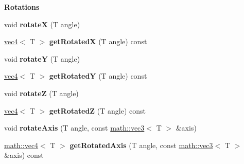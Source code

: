 \begin{Indent}{\bf Rotations}\par
{\em \label{_amgrpe3a9f3ceea2a861d915023ad0a1b98b0}
 }\begin{DoxyCompactItemize}
\item 
\hypertarget{classmath_1_1vec4_a0c0b102f730831e00f43a23a1561bbf1}{
void {\bfseries rotateX} (T angle)}
\label{classmath_1_1vec4_a0c0b102f730831e00f43a23a1561bbf1}

\item 
\hypertarget{classmath_1_1vec4_a7fd5f6afb20d428b36ce25725258018c}{
\hyperlink{classmath_1_1vec4}{vec4}$<$ T $>$ {\bfseries getRotatedX} (T angle) const }
\label{classmath_1_1vec4_a7fd5f6afb20d428b36ce25725258018c}

\item 
\hypertarget{classmath_1_1vec4_a0e143a0a52e0a8a0d4e0f08e588cda84}{
void {\bfseries rotateY} (T angle)}
\label{classmath_1_1vec4_a0e143a0a52e0a8a0d4e0f08e588cda84}

\item 
\hypertarget{classmath_1_1vec4_a601aac1fa9439d44fe52fe0b49c185b7}{
\hyperlink{classmath_1_1vec4}{vec4}$<$ T $>$ {\bfseries getRotatedY} (T angle) const }
\label{classmath_1_1vec4_a601aac1fa9439d44fe52fe0b49c185b7}

\item 
\hypertarget{classmath_1_1vec4_a18d44d4896f3d93d960f5eddb7618c07}{
void {\bfseries rotateZ} (T angle)}
\label{classmath_1_1vec4_a18d44d4896f3d93d960f5eddb7618c07}

\item 
\hypertarget{classmath_1_1vec4_adc8bbf0a6e2ea9948d2d6d9af6f3d2d2}{
\hyperlink{classmath_1_1vec4}{vec4}$<$ T $>$ {\bfseries getRotatedZ} (T angle) const }
\label{classmath_1_1vec4_adc8bbf0a6e2ea9948d2d6d9af6f3d2d2}

\item 
\hypertarget{classmath_1_1vec4_a36713f548216b66841ba0598ee6d71d4}{
void {\bfseries rotateAxis} (T angle, const \hyperlink{classmath_1_1vec3}{math::vec3}$<$ T $>$ \&axis)}
\label{classmath_1_1vec4_a36713f548216b66841ba0598ee6d71d4}

\item 
\hypertarget{classmath_1_1vec4_ad0e8c7e272108fa16a95db2a5537936d}{
\hyperlink{classmath_1_1vec4}{math::vec4}$<$ T $>$ {\bfseries getRotatedAxis} (T angle, const \hyperlink{classmath_1_1vec3}{math::vec3}$<$ T $>$ \&axis) const }
\label{classmath_1_1vec4_ad0e8c7e272108fa16a95db2a5537936d}

\end{DoxyCompactItemize}
\end{Indent}
